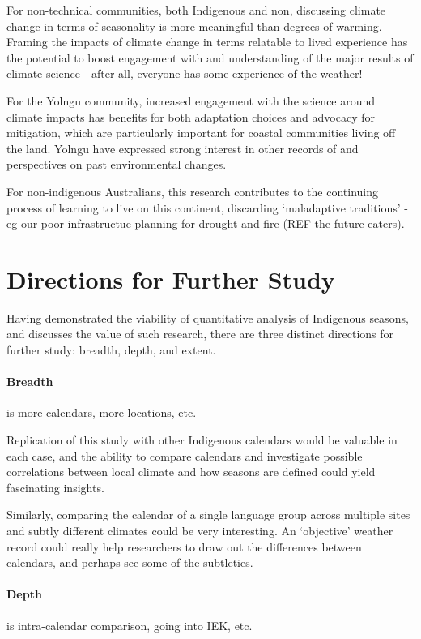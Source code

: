 For non-technical communities, both Indigenous and non, discussing climate
change in terms of seasonality is more meaningful than degrees of warming.
Framing the impacts of climate change in terms relatable to lived experience
has the potential to boost engagement with and understanding of the major
results of climate science - after all, everyone has some experience of the
weather!

For the Yolngu community, increased engagement with the science around climate
impacts has benefits for both adaptation choices and advocacy for mitigation,
which are particularly important for coastal communities living off the land.
Yolngu have expressed strong interest in other records of and perspectives on
past environmental changes.

For non-indigenous Australians, this research contributes to the continuing
process of learning to live on this continent, discarding `maladaptive traditions'
- eg our poor infrastructue planning for drought and fire (REF the future eaters).



\section{Directions for Further Study}
\label{sec:further-study}

Having demonstrated the viability of quantitative analysis of Indigenous
seasons, and discusses the value of such research, there are three distinct
directions for further study:  breadth, depth, and extent.


\paragraph{Breadth} is more calendars, more locations, etc.

Replication of this study with other Indigenous calendars would be
valuable in each case, and the ability to compare calendars and investigate
possible correlations between local climate and how seasons are
defined could yield fascinating insights.

Similarly, comparing the calendar of a single language group across
multiple sites and subtly different climates could be very interesting.
An `objective' weather record could really help researchers to draw out
the differences between calendars, and perhaps see some of the subtleties.


\paragraph{Depth} is intra-calendar comparison, going into IEK, etc.

